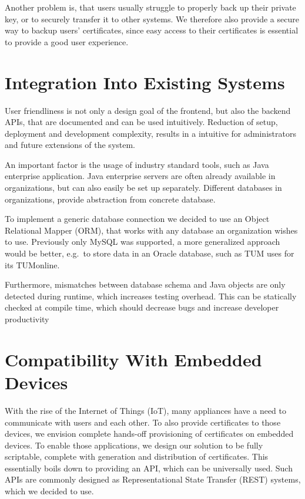 Another problem is, that users usually struggle to properly back up their private key, or to securely transfer it to
other systems.
We therefore also provide a secure way to backup users' certificates, since easy access to their certificates is
essential to provide a good user experience.

\section{Integration Into Existing Systems}\label{sec:integrationIntoExistingSystems}
User friendliness is not only a design goal of the frontend, but also the backend APIs, that are documented and can be
used intuitively.
Reduction of setup, deployment and development complexity, results in a intuitive for administrators and future
extensions of the system.

An important factor is the usage of industry standard tools, such as Java enterprise application.
Java enterprise servers are often already available in organizations, but can also easily be set up separately.
Different databases in organizations, provide abstraction from concrete database.

To implement a generic database connection we decided to use an Object Relational Mapper (ORM), that works with any
database an organization wishes to use.
Previously only MySQL was supported, a more generalized approach would be better, e.g.\ to store data in an Oracle
database, such as TUM uses for its TUMonline.

Furthermore, mismatches between database schema and Java objects are only detected during runtime, which increases
testing overhead.
This can be statically checked at compile time, which should decrease bugs and increase developer productivity

\section{Compatibility With Embedded Devices}\label{sec:compatibilityWithEmbeddedDevices}
With the rise of the Internet of Things (IoT), many appliances have a need to communicate with users and each other.
To also provide certificates to those devices, we envision complete hands-off provisioning of certificates on embedded
devices.
To enable those applications, we design our solution to be fully scriptable, complete with generation and distribution
of certificates.
This essentially boils down to providing an API, which can be universally used.
Such APIs are commonly designed as Representational State Transfer (REST) systems, which we decided to use.

